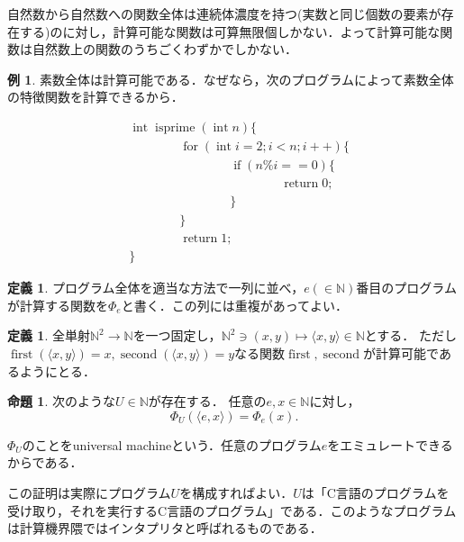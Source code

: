 \documentclass[uplatex]{jsarticle}
\newcommand{\N}{\mathbb{N}}
\theoremstyle{definition} %
\newtheorem{defi}[thm]{定義}
\newtheorem{prop}[thm]{命題}
\newtheorem{exm}[thm]{例}
\begin{document}
自然数から自然数への関数全体は連続体濃度を持つ(実数と同じ個数の要素が存在する)のに対し，計算可能な関数は可算無限個しかない．よって計算可能な関数は自然数上の関数のうちごくわずかでしかない．

\begin{exm}
素数全体は計算可能である．なぜなら，次のプログラムによって素数全体の特徴関数を計算できるから．


\begin{align*}
&\operatorname{int} \operatorname{isprime}(\operatorname{int} n) \{ \\
&\hspace{4em}\operatorname{for} (\operatorname{int} i = 2; i < n; i ++) \{ \\
&\hspace{4em}\hspace{4em}\operatorname{if} (n \% i == 0) \{ \\
&\hspace{4em}\hspace{4em}\hspace{4em}\operatorname{return} 0; \\
&\hspace{4em}\hspace{4em}\} \\
&\hspace{4em}\} \\ 
&\hspace{4em}\operatorname{return} 1; \\
&\}
\end{align*}
\end{exm}

\begin{defi}
プログラム全体を適当な方法で一列に並べ，$e (\in \N)$番目のプログラムが計算する関数を$\Phi_e$と書く．この列には重複があってよい．
\end{defi}

\begin{defi}
全単射$\N^2 \to \N$を一つ固定し，$\N^2 \ni (x, y) \mapsto \langle x, y\rangle \in \N$とする．
ただし$\operatorname{first}(\langle x, y \rangle) = x, \operatorname{second}(\langle x, y \rangle) = y$なる関数$\operatorname{first}, \operatorname{second}$が計算可能であるようにとる．
\end{defi}

\begin{prop}
次のような$U \in \N$が存在する．
任意の$e, x \in \N$に対し，
\[\Phi_U(\langle e, x \rangle) = \Phi_e(x). \]

$\Phi_U$のことをuniversal machineという．任意のプログラム$e$をエミュレートできるからである．
\end{prop}
この証明は実際にプログラム$U$を構成すればよい．$U$は「C言語のプログラムを受け取り，それを実行するC言語のプログラム」である．このようなプログラムは計算機界隈ではインタプリタと呼ばれるものである．
\end{document}
